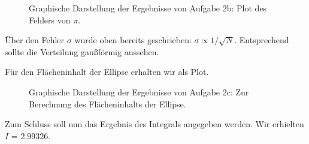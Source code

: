 \begin{landscape}
	\begin{figure}
		\caption{Graphische Darstellung der Ergebnisse von Aufgabe 2b: Plot des Fehlers von $\pi$.}
		\label{fig:2bplot}
	\end{figure}
\end{landscape}
Über den Fehler $\sigma$ wurde oben bereits geschrieben: $\sigma \propto 1/\sqrt{N}$. Entsprechend sollte die Verteilung gaußförmig aussehen.

Für den Flächeninhalt der Ellipse erhalten wir als Plot.
\begin{landscape}
	\begin{figure}
		\caption{Graphische Darstellung der Ergebnisse von Aufgabe 2c: Zur Berechnung des Flächeninhalts der Ellipse.}
		\label{fig:2c}
	\end{figure}
\end{landscape}

Zum Schluss soll nun das Ergebnis des Integrals angegeben werden. Wir erhielten \\$I$ = 2.99326.


